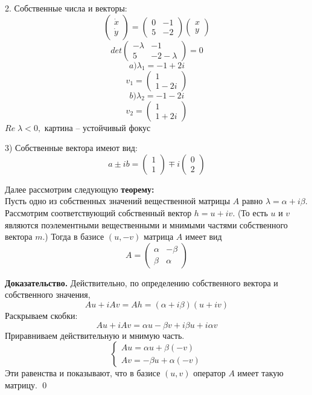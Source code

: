 \documentclass[10pt]{report}
\begin{document}
2. Собственные числа и векторы:
\[\left(
\begin{array}{c}
\dot{x}\\
\dot{y}
\end{array}\right)=
\left(
\begin{array}{cc}
0 & -1 \\
5 & -2
\end{array}\right)
\left(
\begin{array}{c}
x\\
y
\end{array}\right)\]
\[det \left(
\begin{array}{cc}
-\lambda & -1 \\
5 & -2-\lambda
\end{array}\right)=0\]
\[a)\lambda_1 = -1+ 2i\]
\[v_1=\left(
\begin{array}{c}
1\\
1-2i
\end{array}\right)\]
\[b)\lambda_2 = -1- 2i\]
\[v_2=\left(
\begin{array}{c}
1\\
1+2i
\end{array}\right)\]
$Re\; \lambda < 0,$ картина -- устойчивый фокус

3) Собственные вектора имеют вид:
\[a \pm ib=\left(
\begin{array}{c}
1\\
1
\end{array}\right)\mp i\left(
\begin{array}{c}
0\\
2
\end{array}\right)\]

Далее рассмотрим следующую  \textbf{теорему:} \\ Пусть одно из собственных значений вещественной матрицы $A$ равно $\lambda = \alpha + i\beta$.  Рассмотрим соответствующий собственный вектор $ h=u+i v$. (То есть $ u$ и $ v$ являются поэлементными вещественными и мнимыми частями собственного вектора $ m$.) Тогда в базисе $( u, - v)$ матрица $A$ имеет вид
\[A=\left(
\begin{array}{cc}
\alpha & -\beta\\
\beta & \alpha
\end{array}\right)\]

\textbf{Доказательство.} Действительно, по определению собственного вектора и собственного значения,
\[A u+iAv=Ah=(\alpha+i\beta)(u+iv)\]
Раскрываем скобки:
\[Au+iAv=\alpha u - \beta v +i\beta u + i \alpha v\]
Приравниваем действительную и мнимую часть.
\[\begin{cases}
            A u= \alpha u + \beta(- v) \\
            A v= -\beta  u + \alpha (- v)
        \end{cases}\]
Эти равенства и показывают, что в базисе $( u,  v)$ оператор $A$ имеет такую матрицу. \qed \\
\end{document}
